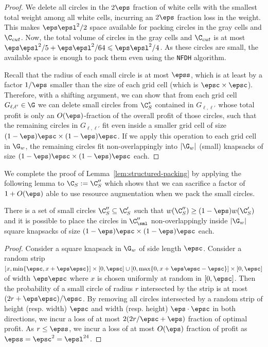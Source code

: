 \begin{proof}
	We delete all circles in the $2\eps$ fraction of white cells with the smallest total
	weight among all white cells, incurring an $2\eps$ fraction loss in the weight.
	This makes $\eps \epsl^2/2$ space available for packing circles in the gray cells and $\C_{cut}$.
	Now, the total volume of circles in the gray cells and $\C_{cut}$ is at most  $\eps \epsl^2/5 + \eps \epsl^2/64 \leqslant \eps \epsl^2/4$. As these circles are small, the available space is enough to pack them even using the \texttt{NFDH} algorithm. 

	Recall that the radius of each
	small circle is at most $\epss$, which is at least by a factor
	$1/\eps$ smaller than the size of each grid cell (which is $\epsc \times\epsc$).
	Therefore, with a shifting argument, we can show that from each grid
	cell $G_{\ell,\ell'}\in\G$ we can delete small circles from $\C^*_S$ contained in
	$G_{\ell,\ell'}$ whose total profit is only an $O(\eps)$-fraction
	of the overall profit of those circles, such
	that the remaining circles in $G_{\ell,\ell'}$ fit even inside a smaller
	grid cell of size $(1-\eps)\epsc \times(1-\eps)\epsc$.
	If we apply this operation to each grid cell in $\G_{w}$, the remaining
	circles fit non-overlappingly into $|\G_{w}|$ (small) knapsacks of
	size $(1-\eps)\epsc \times(1-\eps)\epsc$
	each.
\end{proof}

We complete the proof of Lemma~\ref{lem:structured-packing} by applying the following lemma to $\C_{S}:= \C''_{S}$
which shows that we can sacrifice a factor of $1+O(\eps)$  able to use resource augmentation when we pack the small circles.

\begin{lem}
	\label{lem:grid-resource-augmentation-1}
	There is a set of small circles $\C''_{S}\subseteq\C'_{S}$ such that $w(\C''_{S})\ge(1-\eps)w(\C'_{S})$ and it is possible to place the circles in $\C''_{\sml}$ non-overlappingly inside $|\G_{w}|$ square knapsacks of size $(1-\eps)\epsc \times(1-\eps)\epsc$ each.
	\end{lem}

\begin{proof}
	Consider a square knapsack in $\G_{w}$ of side length $\epsc$.
        Consider a random strip $[x, \min\{\epsc, x+\eps\epsc\}]\times [0,\epsc] \cup [0, \max\{0, x+\eps\epsc -\epsc\}] \times [0,\epsc]$ of width $\eps\epsc$ where $x$ is chosen uniformly at random in $[0,\epsc]$. Then the probability of a small circle of radius $r$ intersected by the strip is at most $(2r+\eps\epsc)/\epsc$.
	By removing all circles intersected by a random strip of height (resp. width) $\epsc$ and width (resp. height) $\eps\cdot\epsc$ in both directions, we incur a loss of at most $2(2 r/\epsc + \eps)$ fraction of optimal profit. As $r\le \epss$, we incur a loss of at most $O(\eps)$ fraction of profit as $\epss = \epsc^2 = \epsl^{24}$.
\end{proof}



